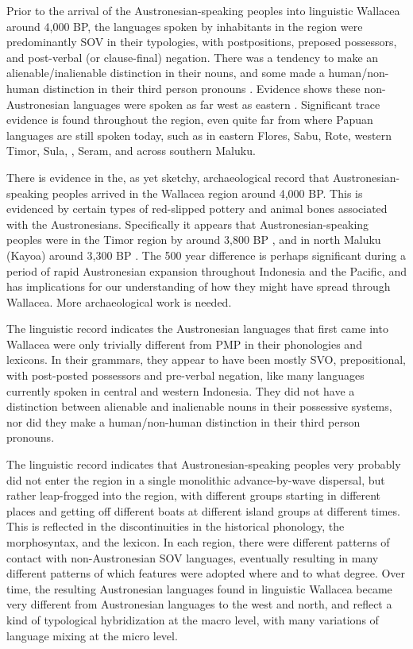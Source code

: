 Prior to the arrival of the Austronesian-speaking peoples into
linguistic Wallacea around 4,000 BP,
the languages spoken by inhabitants in the region were predominantly
SOV in their typologies,
with postpositions, preposed possessors,
and post-verbal (or clause-final) negation.
There was a tendency to make an alienable/inalienable distinction
in their nouns, and some made a human/non-human distinction in their third person
pronouns
\citep{Klamer2019,KlamerReesinkVanStaden2008,Reesink2002b,ReesinkDunn2018}.
Evidence shows these non-Austronesian languages were spoken as
far west as eastern  \citep{Donohue2007}.
Significant trace evidence is found throughout the region,
even quite far from where Papuan languages are still spoken today,
such as in eastern Flores,
Sabu, Rote, western Timor, Sula,
, Seram, and across southern Maluku.

There is evidence in the, as yet sketchy, archaeological record
that Austronesian-speaking peoples arrived in the Wallacea
region around 4,000 BP.
This is evidenced by certain types of red-slipped pottery
and animal bones associated with the Austronesians.
Specifically it appears that Austronesian-speaking peoples were
in the Timor region by around 3,800 BP \citep{Spriggs2011},
and in north Maluku (Kayoa) around 3,300 BP \citep{Bellwood2019a}.
The 500 year difference is perhaps significant during a period
of rapid Austronesian expansion throughout Indonesia
and the Pacific, and has implications for our understanding of
how they might have spread through Wallacea.
More archaeological work is needed.

The linguistic record indicates the Austronesian languages that
first came into Wallacea were only trivially different from
PMP in their phonologies and lexicons.
In their grammars, they appear to have been mostly SVO,
prepositional, with post-posted possessors
and pre-verbal negation, like many languages currently spoken
in central and western Indonesia.
They did not have a distinction between alienable
and inalienable nouns in their possessive systems,
nor did they make a human/non-human distinction in their third person pronouns.

The linguistic record indicates that Austronesian-speaking peoples
very probably did not enter the region in a single monolithic
advance-by-wave dispersal, but rather leap-frogged into the region,
with different groups starting in different places
and getting off different boats at different island groups at different times.
This is reflected in the discontinuities in the historical phonology,
the morphosyntax, and the lexicon.
In each region, there were different patterns of contact with
non-Austronesian SOV languages, eventually resulting in many different patterns of which features
were adopted where and to what degree.
Over time, the resulting Austronesian languages found in linguistic
Wallacea became very different from Austronesian languages to
the west and north, and reflect a kind of typological hybridization at
the macro level, with many variations of language mixing at the micro level.

